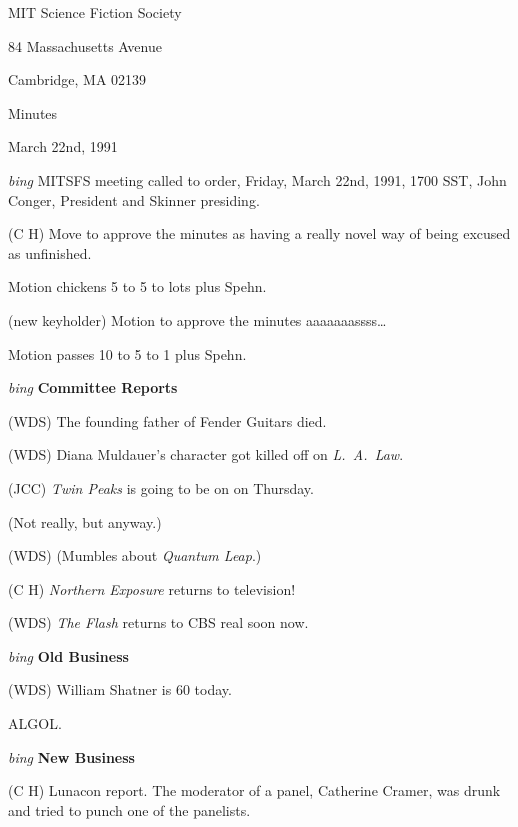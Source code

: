\setlength{\topmargin}{-0.5in}
\setlength{\oddsidemargin}{0.0in}
\setlength{\evensidemargin}{0.0in}
\setlength{\textheight}{9in}
\setlength{\textwidth}{6.5in}



\begin{center}
MIT Science Fiction Society

84 Massachusetts Avenue

Cambridge, MA 02139

\vspace{0.2in}
Minutes

March 22nd, 1991

\end{center}

\vspace{0.15in}
{\em bing\/}  MITSFS meeting called to order, Friday, March 22nd, 1991,
1700 SST, John Conger, President and Skinner presiding.

(C H) Move to approve the minutes as having a really novel way of being
excused as unfinished.

Motion chickens 5 to 5 to lots plus Spehn.

(new keyholder) Motion to approve the minutes aaaaaaassss\ldots

Motion passes 10 to 5 to 1 plus Spehn.

\vspace{0.15in}
{\em bing\/} {\bf Committee Reports\/}

(WDS) The founding father of Fender Guitars died.

(WDS) Diana Muldauer's character got killed off on {\em L.~A.~Law}.

(JCC) {\em Twin Peaks\/} is going to be on on Thursday.

(Not really, but anyway.)

(WDS) (Mumbles about {\em Quantum Leap}.)

(C H) {\em Northern Exposure\/} returns to television!

(WDS) {\em The Flash\/} returns to CBS real soon now.

\vspace{.15in}
{\em bing\/} {\bf Old Business\/}

(WDS) William Shatner is 60 today.

ALGOL.

\vspace{0.15in}
{\em bing\/} {\bf New Business\/}

(C H) Lunacon report.  The moderator of a panel, Catherine Cramer,
was drunk and tried to punch
one of the panelists.

